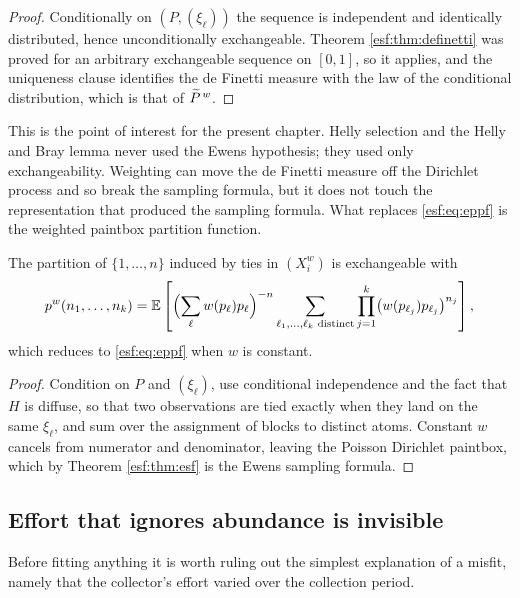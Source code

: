 \begin{proof}
Conditionally on $(P, (\xi_\ell))$ the sequence is independent and identically
distributed, hence unconditionally exchangeable. Theorem \ref{esf:thm:definetti} was
proved for an arbitrary exchangeable sequence on $[0,1]$, so it applies, and the
uniqueness clause identifies the de Finetti measure with the law of the conditional
distribution, which is that of $\widetilde{P}^{\, w}$.
\end{proof}

This is the point of interest for the present chapter. Helly selection and the Helly and
Bray lemma never used the Ewens hypothesis; they used only exchangeability. Weighting
can move the de Finetti measure off the Dirichlet process and so break the
sampling formula, but it does not touch the representation that produced the sampling
formula. What replaces \eqref{esf:eq:eppf} is the weighted paintbox partition function.

\begin{proposition}
\label{esf:prop:weppf}
The partition of $\{1,\dots,n\}$ induced by ties in $(X_i^w)$ is exchangeable with
\begin{equation}
p^{w}(n_1, \dots, n_k)
= \mathbb{E} \left[ \Bigl( \sum_{\ell} w(p_\ell) p_\ell \Bigr)^{-n}
\sum_{\ell_1, \dots, \ell_k \text{ distinct}}
\prod_{j=1}^{k} \bigl( w(p_{\ell_j}) p_{\ell_j} \bigr)^{n_j} \right],
\label{esf:eq:weppf}
\end{equation}
which reduces to \eqref{esf:eq:eppf} when $w$ is constant.
\end{proposition}

\begin{proof}
Condition on $P$ and $(\xi_\ell)$, use conditional independence and the fact that $H$
is diffuse, so that two observations are tied exactly when they land on the same
$\xi_\ell$, and sum over the assignment of blocks to distinct atoms. Constant $w$
cancels from numerator and denominator, leaving the Poisson Dirichlet paintbox, which
by Theorem \ref{esf:thm:esf} is the Ewens sampling formula.
\end{proof}

\subsection{Effort that ignores abundance is invisible}

Before fitting anything it is worth ruling out the simplest explanation of a misfit,
namely that the collector's effort varied over the collection period.

